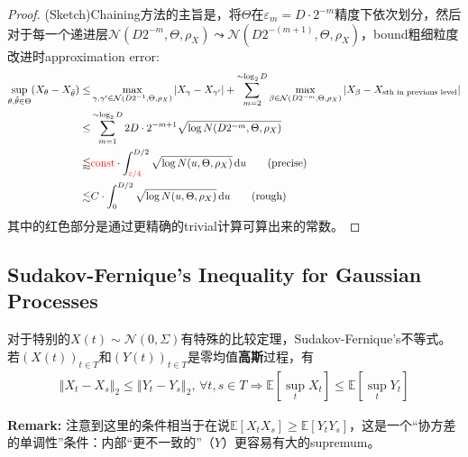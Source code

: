 \documentclass[11pt,a4paper]{ctexart}
\numberwithin{equation}{section}%
\begin{document}
\begin{proof}
    (Sketch)Chaining方法的主旨是，将$ \Theta $在$ \varepsilon _m = D\cdot 2^{-m} $精度下依次划分，然后对于每一个递进层$ \mathcal{N}(D2^{-m},\Theta, \rho _X)\leadsto \mathcal{N}(D2^{-(m+1)},\Theta, \rho _X) $，bound粗细粒度改进时approximation error:
    \begin{align*}
        \mathop{ \sup  }\limits_{\theta ,\tilde{\theta }\in \Theta} (X_\theta -X_{\tilde{\theta }}) \leq & \max_{\gamma ,\gamma '\in \mathcal{N}(D2^{-1},\Theta, \rho _X) } \vert X_\gamma - X_{\gamma '} \vert + \sum_{m=2}^{\sim \log_2 D} \max_{\beta \in \mathcal{N}(D2^{-m},\Theta, \rho _X) } \vert X_\beta  - X_{\text{sth in previous level}} \vert \\
        \leq & \sum_{m=1}^{\sim \log_2 D} 2D\cdot 2^{-m+1} \sqrt{\log N(D2^{-m}, \Theta, \rho _X) } \\
        \lessapprox & {\color{red}\mathrm{const} }\cdot \int^{D/2}_{\color{red} \varepsilon /4}\sqrt{\log N(u, \Theta, \rho _X) }\,\mathrm{d}u\tag{precise}\\
        \lesssim &C\cdot \int_{0}^{D/2} \sqrt{\log N(u, \Theta, \rho _X)} \,\mathrm{d}u\tag{rough}
    \end{align*}
    其中的红色部分是通过更精确的trivial计算可算出来的常数。
\end{proof}









\subsection{Sudakov-Fernique's Inequality for Gaussian Processes}
对于特别的$ X(t)\sim \mathcal{N}(0,\Sigma ) $有特殊的比较定理，Sudakov-Fernique's不等式。若$ (X(t))_{t\in T} $和$ (Y(t))_{t\in T} $是零均值\textbf{高斯}过程，有
\begin{align*}
    \left\Vert X_t-X_s  \right\Vert _2 \leq \left\Vert Y_t-Y_s  \right\Vert _2 ,\,\forall t,s\in T \Rightarrow \mathbb{E}\left[ \sup_t X_t \right] \leq \mathbb{E}\left[ \sup_t Y_t \right] 
\end{align*}

\textbf{Remark: }注意到这里的条件相当于在说$ \mathbb{E}\left[ X_tX_s \right] \geq \mathbb{E}\left[ Y_tY_s \right] $，这是一个“协方差的单调性”条件：内部“更不一致的”（$ Y $）更容易有大的supremum。
\end{document}
